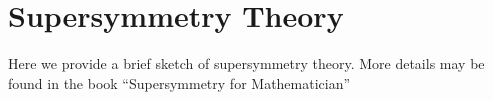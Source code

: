
\chapter{Supersymmetry Theory}
\label{ap:SUSY}

Here we provide a brief sketch of supersymmetry theory. More details may be found in the book ``Supersymmetry for Mathematician'' \cite{varadarajan}

